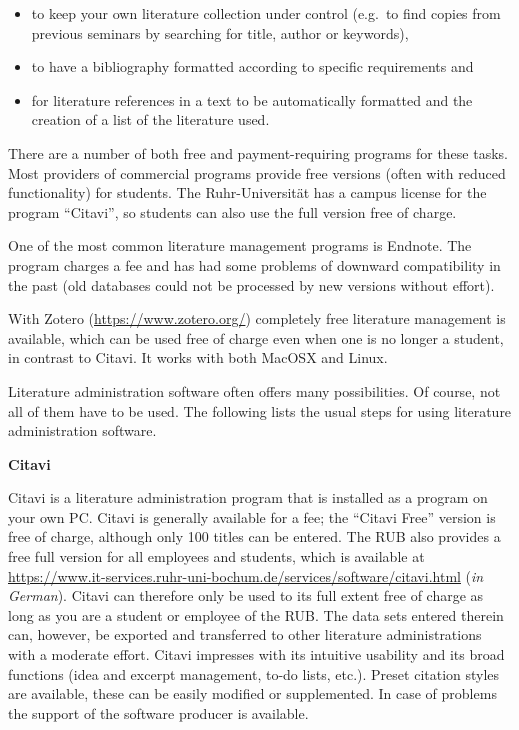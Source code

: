 \documentclass[
  english,
]{scrreprt}
\begin{document}
\begin{itemize}
\item
  to keep your own literature collection under control (e.g.~to find copies from previous seminars by searching for title, author or keywords),
\item
  to have a bibliography formatted according to specific requirements and
\item
  for literature references in a text to be automatically formatted and the creation of a list of the literature used.
\end{itemize}

There are a number of both free and payment-requiring programs for these tasks. Most providers of commercial programs provide free versions (often with reduced functionality) for students. The Ruhr-Universität has a campus license for the program “Citavi”, so students can also use the full version free of charge.

One of the most common literature management programs is Endnote. The program charges a fee and has had some problems of downward compatibility in the past (old databases could not be processed by new versions without effort).

With Zotero (\url{https://www.zotero.org/}) completely free literature management is available, which can be used free of charge even when one is no longer a student, in contrast to Citavi. It works with both MacOSX and Linux.

Literature administration software often offers many possibilities. Of course, not all of them have to be used. The following lists the usual steps for using literature administration software.

\textbf{Citavi}

Citavi is a literature administration program that is installed as a program on your own PC. Citavi is generally available for a fee; the “Citavi Free” version is free of charge, although only 100 titles can be entered. The RUB also provides a free full version for all employees and students, which is available at \url{https://www.it-services.ruhr-uni-bochum.de/services/software/citavi.html} (\emph{in German}). Citavi can therefore only be used to its full extent free of charge as long as you are a student or employee of the RUB. The data sets entered therein can, however, be exported and transferred to other literature administrations with a moderate effort. Citavi impresses with its intuitive usability and its broad functions (idea and excerpt management, to-do lists, etc.). Preset citation styles are available, these can be easily modified or supplemented. In case of problems the support of the software producer is available.
\end{document}
